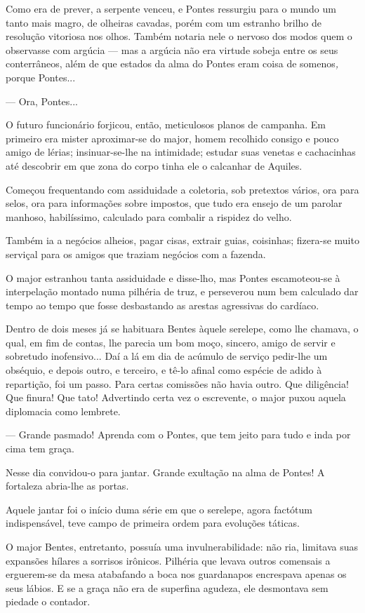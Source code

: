 Como era de prever, a serpente venceu, e Pontes ressurgiu para o mundo
um tanto mais magro, de olheiras cavadas, porém com um estranho brilho
de resolução vitoriosa nos olhos. Também notaria nele o nervoso dos
modos quem o observasse com argúcia --- mas a argúcia não era virtude
sobeja entre os seus conterrâneos, além de que estados da alma do Pontes
eram coisa de somenos\emph{,} porque Pontes...

--- Ora, Pontes...

O futuro funcionário forjicou, então, meticulosos planos de campanha. Em
primeiro era mister aproximar-se do major, homem recolhido consigo e
pouco amigo de lérias; insinuar-se-lhe na intimidade; estudar suas
venetas e cachacinhas até descobrir em que zona do corpo tinha ele o
calcanhar de Aquiles.

Começou frequentando com assiduidade a coletoria, sob pretextos vários,
ora para selos, ora para informações sobre impostos, que tudo era ensejo
de um parolar manhoso, habilíssimo, calculado para combalir a rispidez
do velho.

Também ia a negócios alheios, pagar cisas, extrair guias, coisinhas;
fizera-se muito serviçal para os amigos que traziam negócios com a
fazenda.

O major estranhou tanta assiduidade e disse-lho, mas Pontes
escamoteou-se à interpelação montado numa pilhéria de truz, e perseverou
num bem calculado dar tempo ao tempo que fosse desbastando as arestas
agressivas do cardíaco.

Dentro de dois meses já se habituara Bentes àquele serelepe, como lhe
chamava, o qual, em fim de contas, lhe parecia um bom moço, sincero,
amigo de servir e sobretudo inofensivo... Daí a lá em dia de acúmulo de
serviço pedir-lhe um obséquio, e depois outro, e terceiro, e tê-lo
afinal como espécie de adido à repartição, foi um passo. Para certas
comissões não havia outro. Que diligência! Que finura! Que tato!
Advertindo certa vez o escrevente, o major puxou aquela diplomacia como
lembrete.

--- Grande pasmado! Aprenda com o Pontes, que tem jeito para tudo e inda
por cima tem graça.

Nesse dia convidou-o para jantar. Grande exultação na alma de Pontes! A
fortaleza abria-lhe as portas.

Aquele jantar foi o início duma série em que o serelepe, agora factótum
indispensável, teve campo de primeira ordem para evoluções táticas.

O major Bentes, entretanto, possuía uma invulnerabilidade: não ria,
limitava suas expansões hílares a sorrisos irônicos. Pilhéria que levava
outros comensais a erguerem-se da mesa atabafando a boca nos guardanapos
encrespava apenas os seus lábios. E se a graça não era de superfina
agudeza, ele desmontava sem piedade o contador.

